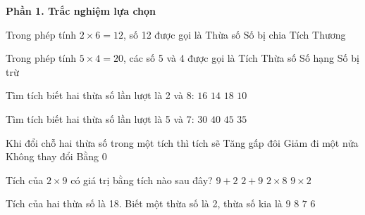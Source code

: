 \textbf{Phần 1. Trắc nghiệm lựa chọn}

\begin{ex} %
Trong phép tính $2 \times 6 = 12$, số 12 được gọi là
\choice
{Thừa số}
{Số bị chia}
{\True Tích}
{Thương}
\end{ex}

\begin{ex} %
Trong phép tính $5 \times 4 = 20$, các số 5 và 4 được gọi là
\choice
{Tích}
{\True Thừa số}
{Số hạng}
{Số bị trừ}
\end{ex}

\begin{ex} %
Tìm tích biết hai thừa số lần lượt là 2 và 8:
\choice
{\True $16$}
{$14$}
{$18$}
{$10$}
\end{ex}

\begin{ex} %
Tìm tích biết hai thừa số lần lượt là 5 và 7:
\choice
{$30$}
{$40$}
{$45$}
{\True $35$}
\end{ex}

\begin{ex} %
Khi đổi chỗ hai thừa số trong một tích thì tích sẽ
\choice
{Tăng gấp đôi}
{Giảm đi một nửa}
{\True Không thay đổi}
{Bằng 0}
\end{ex}

\begin{ex} %
Tích của $2 \times 9$ có giá trị bằng tích nào sau đây?
\choice
{$9 + 2$}
{$2 + 9$}
{$2 \times 8$}
{\True $9 \times 2$}
\end{ex}

\begin{ex} %
Tích của hai thừa số là 18. Biết một thừa số là 2, thừa số kia là
\choice
{\True $9$}
{$8$}
{$7$}
{$6$}
\end{ex}

